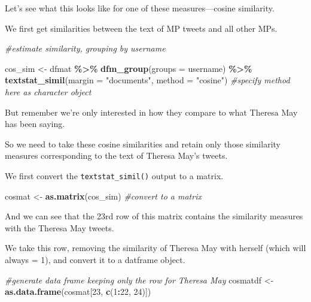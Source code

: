\documentclass[
]{article}
\newenvironment{Shaded}{\begin{snugshade}}{\end{snugshade}}
\newcommand{\AttributeTok}[1]{\textcolor[rgb]{0.13,0.29,0.53}{#1}}
\newcommand{\CommentTok}[1]{\textcolor[rgb]{0.56,0.35,0.01}{\textit{#1}}}
\newcommand{\DecValTok}[1]{\textcolor[rgb]{0.00,0.00,0.81}{#1}}
\newcommand{\FunctionTok}[1]{\textcolor[rgb]{0.13,0.29,0.53}{\textbf{#1}}}
\newcommand{\NormalTok}[1]{#1}
\newcommand{\OtherTok}[1]{\textcolor[rgb]{0.56,0.35,0.01}{#1}}
\newcommand{\SpecialCharTok}[1]{\textcolor[rgb]{0.81,0.36,0.00}{\textbf{#1}}}
\newcommand{\StringTok}[1]{\textcolor[rgb]{0.31,0.60,0.02}{#1}}
\begin{document}
Let's see what this looks like for one of these measures---cosine
similarity.

We first get similarities between the text of MP tweets and all other
MPs.

\begin{Shaded}
\begin{Highlighting}[]
\CommentTok{\#estimate similarity, grouping by username}

\NormalTok{cos\_sim }\OtherTok{\textless{}{-}}\NormalTok{ dfmat }\SpecialCharTok{\%\textgreater{}\%}
  \FunctionTok{dfm\_group}\NormalTok{(}\AttributeTok{groups =}\NormalTok{ username) }\SpecialCharTok{\%\textgreater{}\%}
  \FunctionTok{textstat\_simil}\NormalTok{(}\AttributeTok{margin =} \StringTok{"documents"}\NormalTok{, }\AttributeTok{method =} \StringTok{"cosine"}\NormalTok{) }\CommentTok{\#specify method here as character object}
\end{Highlighting}
\end{Shaded}

But remember we're only interested in how they compare to what Theresa
May has been saying.

So we need to take these cosine similarities and retain only those
similarity measures corresponding to the text of Theresa May's tweets.

We first convert the \texttt{textstat\_simil()} output to a matrix.

\begin{Shaded}
\begin{Highlighting}[]
\NormalTok{cosmat }\OtherTok{\textless{}{-}} \FunctionTok{as.matrix}\NormalTok{(cos\_sim) }\CommentTok{\#convert to a matrix}
\end{Highlighting}
\end{Shaded}

And we can see that the 23rd row of this matrix contains the similarity
measures with the Theresa May tweets.

We take this row, removing the similarity of Theresa May with herself
(which will always = 1), and convert it to a datframe object.

\begin{Shaded}
\begin{Highlighting}[]
\CommentTok{\#generate data frame keeping only the row for Theresa May}
\NormalTok{cosmatdf }\OtherTok{\textless{}{-}} \FunctionTok{as.data.frame}\NormalTok{(cosmat[}\DecValTok{23}\NormalTok{, }\FunctionTok{c}\NormalTok{(}\DecValTok{1}\SpecialCharTok{:}\DecValTok{22}\NormalTok{, }\DecValTok{24}\NormalTok{)])}
\end{Highlighting}
\end{Shaded}
\end{document}

